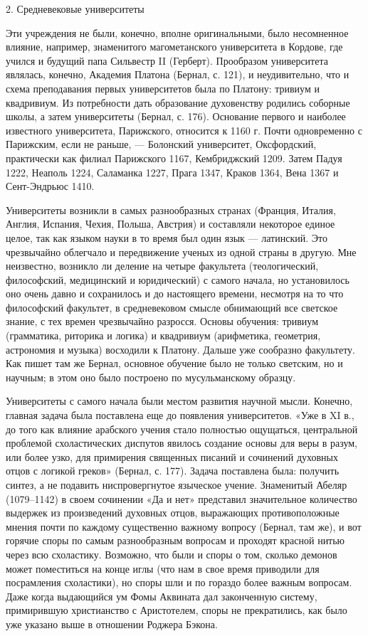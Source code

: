 2. Средневековые университеты

Эти учреждения не были, конечно, вполне оригинальными, было несомненное
влияние, например, знаменитого магометанского университета в Кордове, где
учился и будущий папа Сильвестр II (Герберт). Прообразом университета
являлась, конечно, Академия Платона (Бернал, с. 121), и неудивительно, что и
схема преподавания первых университетов была по Платону: тривиум и
квадривиум. Из потребности дать образование духовенству родились соборные
школы, а затем университеты (Бернал, с. 176). Основание первого и наиболее
известного университета, Парижского, относится к 1160 г. Почти одновременно с
Парижским, если не раньше, --- Болонский университет, Оксфордский,
практически как филиал Парижского 1167, Кембриджский 1209. Затем Падуя
1222, Неаполь 1224, Саламанка 1227, Прага 1347, Краков 1364, Вена 1367 и
Сент-Эндрьюс 1410.

Университеты возникли в самых разнообразных странах (Франция, Италия,
Англия, Испания, Чехия, Польша, Австрия) и составляли некоторое единое
целое, так как языком науки в то время был один язык --- латинский. Это
чрезвычайно облегчало и передвижение ученых из одной страны в другую. Мне
неизвестно, возникло ли деление на четыре факультета (теологический,
философский, медицинский и юридический) с самого начала, но установилось оно
очень давно и сохранилось и до настоящего времени, несмотря на то что
философский факультет, в средневековом смысле обнимающий все светское
знание, с тех времен чрезвычайно разросся. Основы обучения: тривиум
(грамматика, риторика и логика) и квадривиум (арифметика, геометрия,
астрономия и музыка) восходили к Платону. Дальше уже сообразно факультету. Как
пишет там же Бернал, основное обучение было не только светским, но и
научным; в этом оно было построено по мусульманскому образцу.

Университеты с самого начала были местом развития научной мысли. Конечно,
главная задача была поставлена еще до появления университетов. «Уже в XI в.,
до того как влияние арабского учения стало полностью ощущаться, центральной
проблемой схоластических диспутов явилось создание основы для веры в разум, или
более узко, для примирения священных писаний и сочинений духовных отцов с
логикой греков» (Бернал, с. 177). Задача поставлена была: получить синтез, а
не подавить ниспровергнутое языческое учение. Знаменитый Абеляр (1079--1142) в
своем сочинении «Да и нет» представил значительное количество выдержек из
произведений духовных отцов, выражающих противоположные мнения почти по
каждому существенно важному вопросу (Бернал, там же), и вот горячие споры по
самым разнообразным вопросам и проходят красной нитью через всю схоластику.
Возможно, что были и споры о том, сколько демонов может поместиться на
конце иглы (что нам в свое время приводили для посрамления схоластики), но
споры шли и по гораздо более важным вопросам. Даже когда выдающийся ум Фомы
Аквината дал законченную систему, примирившую христианство с Аристотелем,
споры не прекратились, как было уже указано выше в отношении Роджера Бэкона.

